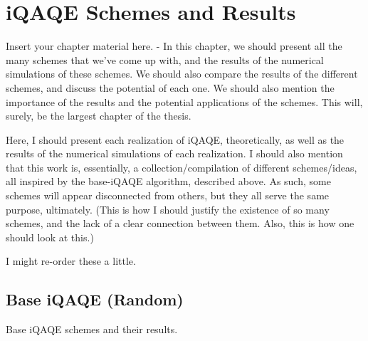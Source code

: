 
\chapter{iQAQE Schemes and Results}
\label{chapter:Schemes_and_Results}

Insert your chapter material here. - In this chapter, we should present all the many schemes that we've come up with, and the results of the numerical simulations of these schemes. We should also compare the results of the different schemes, and discuss the potential of each one. We should also mention the importance of the results and the potential applications of the schemes. This will, surely, be the largest chapter of the thesis.

Here, I should present each realization of iQAQE, theoretically, as well as the results of the numerical simulations of each realization. I should also mention that this work is, essentially, a collection/compilation of different schemes/ideas, all inspired by the base-iQAQE algorithm, described above. As such, some schemes will appear disconnected from others, but they all serve the same purpose, ultimately. (This is how I should justify the existence of so many schemes, and the lack of a clear connection between them. Also, this is how one should look at this.)

I might re-order these a little.





\section{Base iQAQE (Random)}
\label{section:Base_iQAQE}

Base iQAQE schemes and their results.





